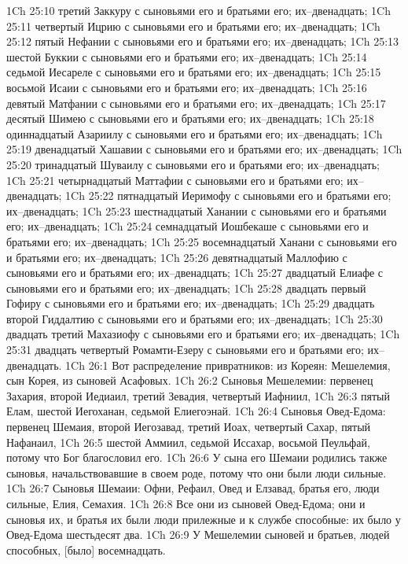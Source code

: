 1Ch 25:10  третий Заккуру с сыновьями его и братьями его; их--двенадцать;
1Ch 25:11  четвертый Ицрию с сыновьями его и братьями его; их--двенадцать;
1Ch 25:12  пятый Нефании с сыновьями его и братьями его; их--двенадцать;
1Ch 25:13  шестой Буккии с сыновьями его и братьями его; их--двенадцать;
1Ch 25:14  седьмой Иесареле с сыновьями его и братьями его; их--двенадцать;
1Ch 25:15  восьмой Исаии с сыновьями его и братьями его; их--двенадцать;
1Ch 25:16  девятый Матфании с сыновьями его и братьями его; их--двенадцать;
1Ch 25:17  десятый Шимею с сыновьями его и братьями его; их--двенадцать;
1Ch 25:18  одиннадцатый Азариилу с сыновьями его и братьями его; их--двенадцать;
1Ch 25:19  двенадцатый Хашавии с сыновьями его и братьями его; их--двенадцать;
1Ch 25:20  тринадцатый Шуваилу с сыновьями его и братьями его; их--двенадцать;
1Ch 25:21  четырнадцатый Маттафии с сыновьями его и братьями его; их--двенадцать;
1Ch 25:22  пятнадцатый Иеримофу с сыновьями его и братьями его; их--двенадцать;
1Ch 25:23  шестнадцатый Ханании с сыновьями его и братьями его; их--двенадцать;
1Ch 25:24  семнадцатый Иошбекаше с сыновьями его и братьями его; их--двенадцать;
1Ch 25:25  восемнадцатый Ханани с сыновьями его и братьями его; их--двенадцать;
1Ch 25:26  девятнадцатый Маллофию с сыновьями его и братьями его; их--двенадцать;
1Ch 25:27  двадцатый Елиафе с сыновьями его и братьями его; их--двенадцать;
1Ch 25:28  двадцать первый Гофиру с сыновьями его и братьями его; их--двенадцать;
1Ch 25:29  двадцать второй Гиддалтию с сыновьями его и братьями его; их--двенадцать;
1Ch 25:30  двадцать третий Махазиофу с сыновьями его и братьями его; их--двенадцать;
1Ch 25:31  двадцать четвертый Ромамти-Езеру с сыновьями его и братьями его; их--двенадцать.
1Ch 26:1  Вот распределение привратников: из Кореян: Мешелемия, сын Корея, из сыновей Асафовых.
1Ch 26:2  Сыновья Мешелемии: первенец Захария, второй Иедиаил, третий Зевадия, четвертый Иафниил,
1Ch 26:3  пятый Елам, шестой Иегоханан, седьмой Елиегоэнай.
1Ch 26:4  Сыновья Овед-Едома: первенец Шемаия, второй Иегозавад, третий Иоах, четвертый Сахар, пятый Нафанаил,
1Ch 26:5  шестой Аммиил, седьмой Иссахар, восьмой Пеульфай, потому что Бог благословил его.
1Ch 26:6  У сына его Шемаии родились также сыновья, начальствовавшие в своем роде, потому что они были люди сильные.
1Ch 26:7  Сыновья Шемаии: Офни, Рефаил, Овед и Елзавад, братья его, люди сильные, Елия, Семахия.
1Ch 26:8  Все они из сыновей Овед-Едома; они и сыновья их, и братья их были люди прилежные и к службе способные: их было у Овед-Едома шестьдесят два.
1Ch 26:9  У Мешелемии сыновей и братьев, людей способных, [было] восемнадцать.
